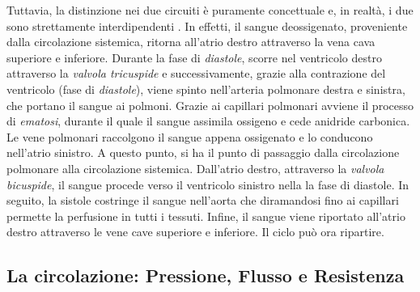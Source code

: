 Tuttavia, la distinzione nei due circuiti è puramente concettuale  e, in realtà, i due sono strettamente interdipendenti \cite{Cutfield1983}. In effetti, il sangue deossigenato, proveniente  dalla circolazione sistemica, ritorna all'atrio destro attraverso la vena cava superiore e inferiore. Durante la fase di \textit{diastole}, scorre nel ventricolo destro attraverso la \textit{valvola tricuspide} e successivamente, grazie alla contrazione del ventricolo (fase di \textit{diastole}), viene spinto nell'arteria polmonare destra e sinistra, che portano il sangue ai polmoni. Grazie ai capillari polmonari avviene il processo di \textit{ematosi}, durante il quale il sangue assimila ossigeno e cede anidride carbonica. Le vene polmonari raccolgono il sangue appena ossigenato e lo conducono nell'atrio sinistro. A questo punto, si ha il punto di passaggio dalla circolazione polmonare alla circolazione sistemica. Dall'atrio destro, attraverso la \textit{valvola bicuspide}, il sangue procede verso il ventricolo sinistro nella la fase di diastole. In seguito, la sistole costringe il sangue nell'aorta che diramandosi fino ai capillari permette la perfusione in tutti i tessuti. Infine, il sangue viene riportato all'atrio destro attraverso le vene cave superiore e inferiore. Il ciclo può ora ripartire. 

\subsection{La circolazione: Pressione, Flusso e Resistenza}
\pagebreak